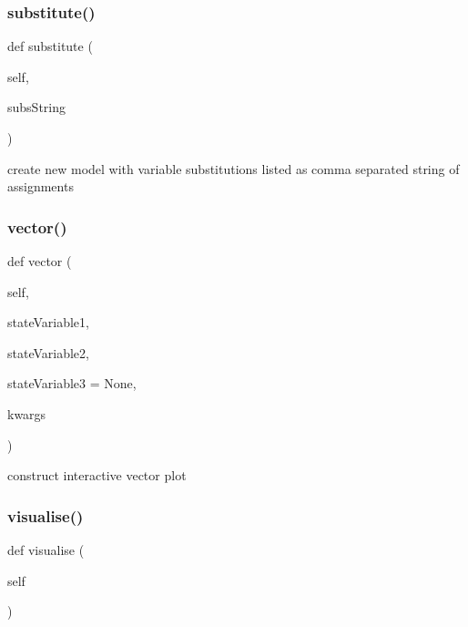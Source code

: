 \subsubsection{\texorpdfstring{substitute()}{substitute()}}
{\footnotesize\ttfamily def substitute (\begin{DoxyParamCaption}\item[{}]{self,  }\item[{}]{subs\+String }\end{DoxyParamCaption})}



create new model with variable substitutions listed as comma separated string of assignments 

\mbox{\label{class_mu_mo_t_1_1_mu_mo_tmodel_aa7a2f83702a081cec49e9f18d8392830}} 
\subsubsection{\texorpdfstring{vector()}{vector()}}
{\footnotesize\ttfamily def vector (\begin{DoxyParamCaption}\item[{}]{self,  }\item[{}]{state\+Variable1,  }\item[{}]{state\+Variable2,  }\item[{}]{state\+Variable3 = {\ttfamily None},  }\item[{}]{kwargs }\end{DoxyParamCaption})}



construct interactive vector plot 

\mbox{\label{class_mu_mo_t_1_1_mu_mo_tmodel_affc6fae7ea26f85cde5366af8af85200}} 
\subsubsection{\texorpdfstring{visualise()}{visualise()}}
{\footnotesize\ttfamily def visualise (\begin{DoxyParamCaption}\item[{}]{self }\end{DoxyParamCaption})}



